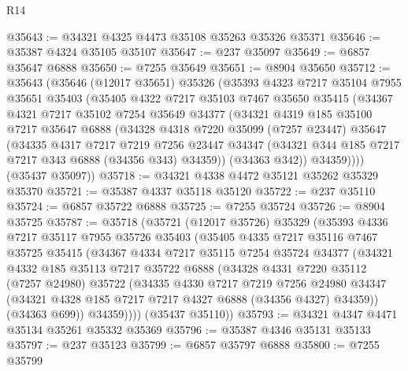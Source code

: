 \begin{lexlean}{R14}
\begin{coremodule}
@35643 := @34321 @4325 @4473 @35108 @35263 @35326 @35371
@35646 := @35387 @4324 @35105 @35107
@35647 := @237 @35097
@35649 := @6857 @35647 @6888
@35650 := @7255 @35649
@35651 := @8904 @35650
@35712 := @35643
    (@35646
      (@12017 @35651)
      @35326
      (@35393
        @4323
        @7217
        @35104
        @7955
        @35651
        @35403
        (@35405
          @4322
          @7217
          @35103
          @7467
          @35650
          @35415
          (@34367
            @4321
            @7217
            @35102
            @7254
            @35649
            @34377
            (@34321
              @4319
              @185
              @35100
              @7217
              @35647
              @6888
              (@34328
                @4318
                @7220
                @35099
                (@7257 @23447)
                @35647
                (@34335
                  @4317
                  @7217
                  @7219
                  @7256
                  @23447
                  @34347
                  (@34321 @344 @185 @7217 @7217 @343 @6888 (@34356 @343) @34359))
                (@34363 @342))
              @34359))))
      (@35437 @35097))
@35718 := @34321 @4338 @4472 @35121 @35262 @35329 @35370
@35721 := @35387 @4337 @35118 @35120
@35722 := @237 @35110
@35724 := @6857 @35722 @6888
@35725 := @7255 @35724
@35726 := @8904 @35725
@35787 := @35718
    (@35721
      (@12017 @35726)
      @35329
      (@35393
        @4336
        @7217
        @35117
        @7955
        @35726
        @35403
        (@35405
          @4335
          @7217
          @35116
          @7467
          @35725
          @35415
          (@34367
            @4334
            @7217
            @35115
            @7254
            @35724
            @34377
            (@34321
              @4332
              @185
              @35113
              @7217
              @35722
              @6888
              (@34328
                @4331
                @7220
                @35112
                (@7257 @24980)
                @35722
                (@34335
                  @4330
                  @7217
                  @7219
                  @7256
                  @24980
                  @34347
                  (@34321 @4328 @185 @7217 @7217 @4327 @6888 (@34356 @4327) @34359))
                (@34363 @699))
              @34359))))
      (@35437 @35110))
@35793 := @34321 @4347 @4471 @35134 @35261 @35332 @35369
@35796 := @35387 @4346 @35131 @35133
@35797 := @237 @35123
@35799 := @6857 @35797 @6888
@35800 := @7255 @35799

\end{coremodule}
\end{lexlean}
